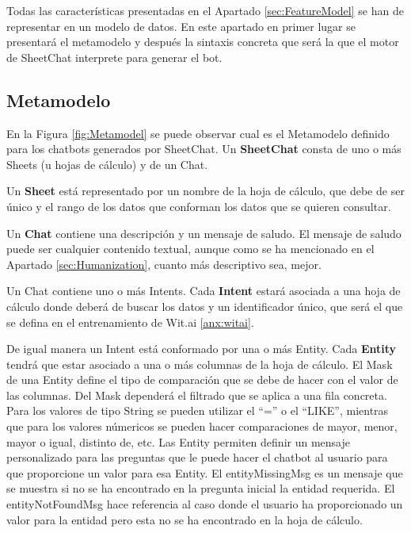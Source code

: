 Todas las características presentadas en el Apartado \ref{sec:FeatureModel} se han de representar en un modelo de datos. En este apartado en primer lugar se presentará el metamodelo y después la sintaxis concreta que será la que el motor de SheetChat interprete para generar el bot.

\subsection{Metamodelo}
\label{sec:Metamodel}

En la Figura \ref{fig:Metamodel} se puede observar cual es el Metamodelo definido para los chatbots generados por SheetChat. Un \textbf{SheetChat} consta de uno o más Sheets (u hojas de cálculo) y de un Chat.

Un \textbf{Sheet} está representado por un nombre de la hoja de cálculo, que debe de ser único y el rango de los datos que conforman los datos que se quieren consultar.

Un \textbf{Chat} contiene una descripción y un mensaje de saludo. El mensaje de saludo puede ser cualquier contenido textual, aunque como se ha mencionado en el Apartado \ref{sec:Humanization}, cuanto más descriptivo sea, mejor.

Un Chat contiene uno o más Intents. Cada \textbf{Intent} estará asociada a una hoja de cálculo donde deberá de buscar los datos y un identificador único, que será el que se defina en el entrenamiento de Wit.ai \ref{anx:witai}.

De igual manera un Intent está conformado por una o más Entity. Cada \textbf{Entity} tendrá que estar asociado a una o más columnas de la hoja de cálculo. El Mask de una Entity define el tipo de comparación que se debe de hacer con el valor de las columnas. Del Mask dependerá el filtrado que se aplica a una fila concreta. Para los valores de tipo String se pueden utilizar el ``='' o el ``LIKE'', mientras que para los valores númericos se pueden hacer comparaciones de mayor, menor, mayor o igual, distinto de, etc. Las Entity permiten definir un mensaje personalizado para las preguntas que le puede hacer el chatbot al usuario para que proporcione un valor para esa Entity. El entityMissingMsg es un mensaje que se muestra si no se ha encontrado en la pregunta inicial la entidad requerida. El entityNotFoundMsg hace referencia al caso donde el usuario ha proporcionado un valor para la entidad pero esta no se ha encontrado en la hoja de cálculo.

